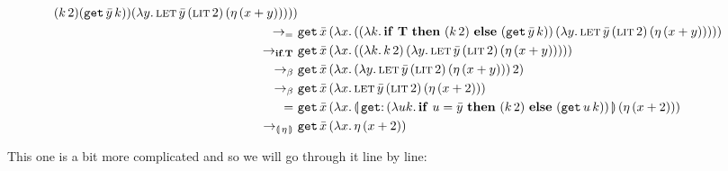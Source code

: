 \begin{align}
{{{{                                     {(\ap{k}{2})}{(\app{\op{get}}{\bar{y}}{k})}})}
                    {(\lam{y}{\appp{\lete}{\bar{y}}{\litec{2}}{(\ap{\eta}{(x + y)})}})})})} \\
\to_=\ &
  \app{\op{get}}{\bar{x}}
     {(\lam{x}{(\ap{(\lam{k}{\ifte{\true}
                                     {(\ap{k}{2})}{(\app{\op{get}}{\bar{y}}{k})}})}
                    {(\lam{y}{\appp{\lete}{\bar{y}}{\litec{2}}{(\ap{\eta}{(x + y)})}})})})} \\
\to_{\textbf{if}.\true}\ &
  \app{\op{get}}{\bar{x}}
     {(\lam{x}{(\ap{(\lam{k}{\ap{k}{2}})}
                   {(\lam{y}{\appp{\lete}{\bar{y}}{\litec{2}}{(\ap{\eta}{(x + y)})}})})})} \\
\to_{\beta}\ &
  \app{\op{get}}{\bar{x}}
     {(\lam{x}{\ap{(\lam{y}{\appp{\lete}{\bar{y}}{\litec{2}}{(\ap{\eta}{(x + y)})}})}
                  {2}})} \\
\to_{\beta}\ &
  \app{\op{get}}{\bar{x}}
     {(\lam{x}{\appp{\lete}{\bar{y}}{\litec{2}}{(\ap{\eta}{(x + 2)})}})} \\
=\ &
  \app{\op{get}}{\bar{x}}
     {(\lam{x}{\ap{\banana{\onto{\op{get}}{(\lam{u k}{\ifte{u = \bar{y}}
                                          {(\ap{k}{2})}{(\app{\op{get}}{u}{k})}})}}}
                  {(\ap{\eta}{(x + 2)})}})} \\
\to_{\banana{\eta}}\ &\app{\op{get}}{\bar{x}} {(\lam{x}{\ap{\eta}{(x + 2)}})}
\end{align}
\setcounter{equation}{0}
\ChapterPrefix

This one is a bit more complicated and so we will go through it line by
line:


